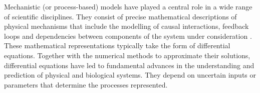 
Mechanistic (or process-based) models have played a central role in a wide range of scientific disciplines. 
They consist of precise mathematical descriptions of physical mechanisms that include the modelling of causal interactions, feedback loops and dependencies between components of the system under consideration \cite{rackauckas2020universal}. 
These mathematical representations typically take the form of differential equations. 
Together with the numerical methods to approximate their solutions, differential equations have led to fundamental advances in the understanding and prediction of physical and biological systems.
They depend on uncertain inputs or parameters that determine the processes represented. 

